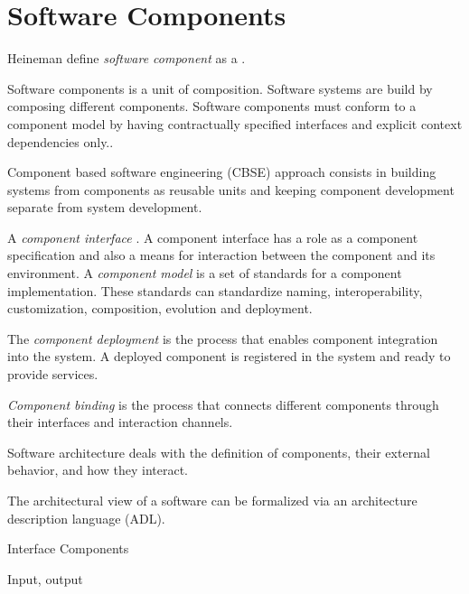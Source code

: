 \section{Software Components}
Heineman define \emph{software component} as a
\cite{heineman_component-based_2001}.

Software components is a unit of composition. Software systems are build by composing different components.  Software components must conform to a component model by having contractually specified interfaces and explicit context dependencies only.\cite{szyperski_component_2002}.

Component based software engineering (CBSE) approach consists in building systems from components as reusable units and keeping component development separate from system development\cite{crnkovic_software_2011}.

A \emph{component	interface} \cite{crnkovic_software_2011}.
A component interface has a role as a component specification and also a means for interaction between the component and its environment.
A \emph{component model} is a set of standards for a component implementation. These standards can standardize naming, interoperability, customization, composition, evolution and deployment.\cite{heineman_component-based_2001}

The \emph{component deployment} is the process that enables component integration into the system. A deployed component is registered in the system and ready to provide services\cite{crnkovic_software_2011}.

\emph{Component binding} is the process that connects different components through their interfaces and interaction channels.

Software architecture deals with the definition of components, their external behavior, and how they interact.\cite{kaur_component_2010}

The architectural view of a software can be formalized via an architecture description language (ADL)\cite{medvidovic_classification_2000}.

Interface
Components

Input, output

